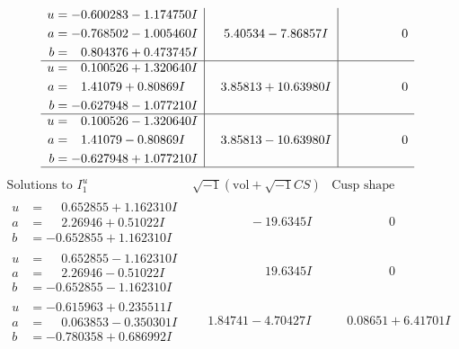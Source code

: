\documentclass[1p]{elsarticle_modified}
\theoremstyle{definition}
\newcommand{\I}{\sqrt{-1}}
\begin{document}
$$\begin{array}{c|c|c}
\begin{aligned}
u &= -0.600283 - 1.174750 I \\
a &= -0.768502 - 1.005460 I \\
b &= \phantom{-}0.804376 + 0.473745 I\end{aligned}
 & \phantom{-}5.40534 - 7.86857 I & \phantom{-0.000000 } 0 \\ \hline\begin{aligned}
u &= \phantom{-}0.100526 + 1.320640 I \\
a &= \phantom{-}1.41079 + 0.80869 I \\
b &= -0.627948 - 1.077210 I\end{aligned}
 & \phantom{-}3.85813 + 10.63980 I & \phantom{-0.000000 } 0 \\ \hline\begin{aligned}
u &= \phantom{-}0.100526 - 1.320640 I \\
a &= \phantom{-}1.41079 - 0.80869 I \\
b &= -0.627948 + 1.077210 I\end{aligned}
 & \phantom{-}3.85813 - 10.63980 I & \phantom{-0.000000 } 0\\
 \hline 
 \end{array}$$\newpage$$\begin{array}{c|c|c}  
\text{Solutions to }I^u_{1}& \I (\text{vol} + \sqrt{-1}CS) & \text{Cusp shape}\\
 \hline 
\begin{aligned}
u &= \phantom{-}0.652855 + 1.162310 I \\
a &= \phantom{-}2.26946 + 0.51022 I \\
b &= -0.652855 + 1.162310 I\end{aligned}
 & \phantom{-0.000000 } -19.6345 I & \phantom{-0.000000 } 0 \\ \hline\begin{aligned}
u &= \phantom{-}0.652855 - 1.162310 I \\
a &= \phantom{-}2.26946 - 0.51022 I \\
b &= -0.652855 - 1.162310 I\end{aligned}
 & \phantom{-0.000000 -}19.6345 I & \phantom{-0.000000 } 0 \\ \hline\begin{aligned}
u &= -0.615963 + 0.235511 I \\
a &= \phantom{-}0.063853 - 0.350301 I \\
b &= -0.780358 + 0.686992 I\end{aligned}
 & \phantom{-}1.84741 - 4.70427 I & \phantom{-}0.08651 + 6.41701 I \\ \hline\begin{aligned}

\end{aligned}
\end{array}$$
\end{document}
